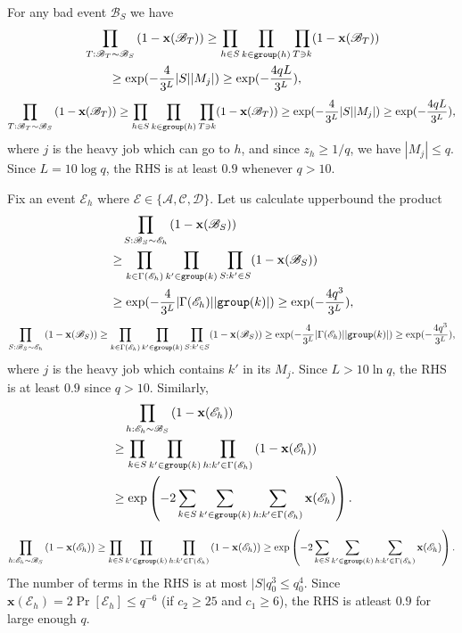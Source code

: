 \documentclass[11pt]{article}
\newcommand{\cA}{{\mathscr A}}
\newcommand{\cB}{\mathscr{B}}
\newcommand{\cC}{{\mathscr C}}
\newcommand{\cD}{\mathscr{D}}
\newcommand{\cE}{{\mathscr E}}
\newcommand{\x}{{\mathbf x}}
\begin{document}
For any bad event $\cB_S$ we have 
\ifdefined\CR
\begin{align*}
&\prod_{T:\cB_T\sim \cB_S}\left(1-\x(\cB_T) \right) \geq  \prod_{h \in S} \prod_{k \in \group(h)} \prod_{T \ni k} (1-\x(\cB_T))\\
&\qquad \geq \exp(-\frac{4}{3^L}|S||M_j|) \geq \exp(-\frac{4qL}{3^L}),
\end{align*}
\else
$$\prod_{T:\cB_T\sim \cB_S}\left(1-\x(\cB_T) \right) \geq  \prod_{h \in S} \prod_{k \in \group(h)} \prod_{T \ni k} (1-\x(\cB_T)) \geq \exp(-\frac{4}{3^L}|S||M_j|) \geq \exp(-\frac{4qL}{3^L}),$$
\fi
where $j$ is the heavy job which can go to $h$, and since $z_h \geq 1/q$, we have $|M_j| \leq q$. Since $L = 10\log q$, the RHS is at least $0.9$ whenever $q > 10$.


Fix an event $\cE_h$ where $\cE \in \{\cA,\cC,\cD\}$. Let us calculate upperbound the product
\ifdefined\CR
\begin{align*}
&\quad \prod_{S:\cB_S\sim \cE_h}\left(1-\x(\cB_S)\right)\\
&\geq \prod_{k \in \Gamma(\cE_h)} \prod_{k' \in \group(k)} \prod_{S: k'\in S} (1-\x(\cB_S))\\
&\geq \exp(-\frac{4}{3^L}|\Gamma(\cE_h)||\group(k)|) \geq \exp(-\frac{4q^3}{3^L}),
\end{align*}
\else
$$\prod_{S:\cB_S\sim \cE_h}\left(1-\x(\cB_S)\right) \geq \prod_{k \in \Gamma(\cE_h)} \prod_{k' \in \group(k)} \prod_{S: k'\in S} (1-\x(\cB_S)) \geq \exp(-\frac{4}{3^L}|\Gamma(\cE_h)||\group(k)|) \geq \exp(-\frac{4q^3}{3^L}),$$
\fi
where $j$ is the heavy job which contains $k'$ in its $M_j$. Since $L > 10\ln q$, the RHS is at least $0.9$ since $q > 10$.
Similarly, 
\ifdefined\CR
\begin{align*}
&\quad\prod_{h: \cE_h \sim \cB_S} \left(1 - \x(\cE_h)\right)\\
&\geq \prod_{k\in S} \prod_{k'\in \group(k)} \prod_{h: k'\in \Gamma(\cE_h)} \left(1 - \x(\cE_h)\right)\\ 
&\geq \exp\left(-2\sum_{k\in S}\sum_{k'\in \group(k)}\sum_{h: k'\in \Gamma(\cE_h)} \x(\cE_h)\right).
\end{align*}
\else
$$\prod_{h: \cE_h \sim \cB_S} \left(1 - \x(\cE_h)\right) \geq \prod_{k\in S} \prod_{k'\in \group(k)} \prod_{h: k'\in \Gamma(\cE_h)} \left(1 - \x(\cE_h)\right) \geq \exp\left(-2\sum_{k\in S}\sum_{k'\in \group(k)}\sum_{h: k'\in \Gamma(\cE_h)} \x(\cE_h)\right).$$
\fi
The number of terms in the RHS is at most $|S|q^3_0 \leq q^4_0$. Since $\x(\cE_h) = 2\Pr[\cE_h] \leq q^{-6}$ (if $c_2 \geq  25$ and $c_1 \geq 6 $), the RHS is atleast $0.9$ for large enough $q$.
\end{document}
